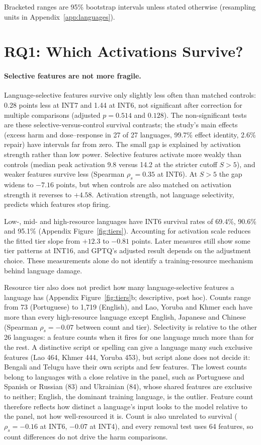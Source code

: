 \documentclass[11pt]{article}
\begin{document}
Bracketed ranges are 95\% bootstrap intervals unless stated otherwise (resampling units in Appendix~\ref{app:languages}).

\section{RQ1: Which Activations Survive?}
\label{sec:rq1}
\paragraph{Selective features are not more fragile.}
Language-selective features survive only slightly less often than matched controls: 0.28 points less at INT7 and 1.44 at INT6, not significant after correction for multiple comparisons (adjusted $p=0.514$ and $0.128$). The non-significant tests are these selective-versus-control survival contrasts; the study's main effects (excess harm and dose--response in 27 of 27 languages, 99.7\% effect identity, 2.6\% repair) have intervals far from zero. The small gap is explained by activation strength rather than low power. Selective features activate more weakly than controls (median peak activation 9.8 versus 14.2 at the stricter cutoff $S>5$), and weaker features survive less (Spearman $\rho_s=0.35$ at INT6). At $S>5$ the gap widens to $-7.16$ points, but when controls are also matched on activation strength it reverses to $+4.58$. Activation strength, not language selectivity, predicts which features stop firing.

Low-, mid- and high-resource languages have INT6 survival rates of 69.4\%, 90.6\% and 95.1\% (Appendix Figure~\ref{fig:tiers}). Accounting for activation scale reduces the fitted tier slope from $+12.3$ to $-0.81$ points. Later measures still show some tier patterns at INT16, and GPTQ's adjusted result depends on the adjustment choice. These measurements alone do not identify a training-resource mechanism behind language damage.

Resource tier also does not predict how many language-selective features a language has (Appendix Figure~\ref{fig:tiers}b; descriptive, post hoc). Counts range from 73 (Portuguese) to 1,719 (English), and Lao, Yoruba and Khmer each have more than every high-resource language except English, Japanese and Chinese (Spearman $\rho_s=-0.07$ between count and tier). Selectivity is relative to the other 26 languages: a feature counts when it fires for one language much more than for the rest. A distinctive script or spelling can give a language many such exclusive features (Lao 464, Khmer 444, Yoruba 453), but script alone does not decide it: Bengali and Telugu have their own scripts and few features. The lowest counts belong to languages with a close relative in the panel, such as Portuguese and Spanish or Russian (83) and Ukrainian (84), whose shared features are exclusive to neither; English, the dominant training language, is the outlier. Feature count therefore reflects how distinct a language's input looks to the model relative to the panel, not how well-resourced it is. Count is also unrelated to survival ($\rho_s=-0.16$ at INT6, $-0.07$ at INT4), and every removal test uses 64 features, so count differences do not drive the harm comparisons.
\end{document}
